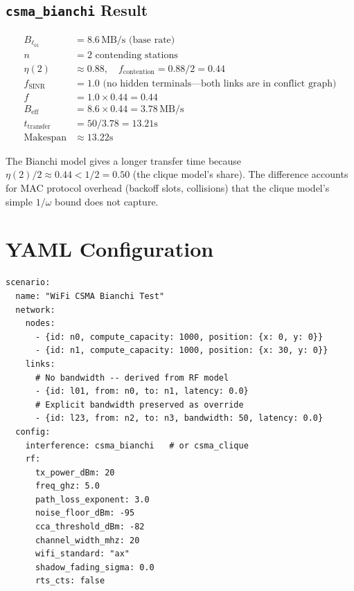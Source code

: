 \documentclass[11pt,letterpaper]{article}
\newcommand{\MBps}{\,\text{MB/s}}
\begin{document}
\subsection{\texttt{csma\_bianchi} Result}

\begin{align*}
B_{\ell_{01}} &= 8.6\MBps \text{ (base rate)} \\
n &= 2 \text{ contending stations} \\
\eta(2) &\approx 0.88, \quad f_\text{contention} = 0.88 / 2 = 0.44 \\
f_\text{SINR} &= 1.0 \text{ (no hidden terminals---both links are in conflict graph)} \\
f &= 1.0 \times 0.44 = 0.44 \\
B_\text{eff} &= 8.6 \times 0.44 = 3.78\MBps \\
t_\text{transfer} &= 50 / 3.78 = 13.21\text{s} \\
\text{Makespan} &\approx 13.22\text{s}
\end{align*}

The Bianchi model gives a longer transfer time because $\eta(2)/2 \approx
0.44 < 1/2 = 0.50$ (the clique model's share).  The difference accounts for
MAC protocol overhead (backoff slots, collisions) that the clique model's
simple $1/\omega$ bound does not capture.

\section{YAML Configuration}
\label{sec:yaml}

\begin{lstlisting}[language={},caption={WiFi scenario YAML example.}]
scenario:
  name: "WiFi CSMA Bianchi Test"
  network:
    nodes:
      - {id: n0, compute_capacity: 1000, position: {x: 0, y: 0}}
      - {id: n1, compute_capacity: 1000, position: {x: 30, y: 0}}
    links:
      # No bandwidth -- derived from RF model
      - {id: l01, from: n0, to: n1, latency: 0.0}
      # Explicit bandwidth preserved as override
      - {id: l23, from: n2, to: n3, bandwidth: 50, latency: 0.0}
  config:
    interference: csma_bianchi   # or csma_clique
    rf:
      tx_power_dBm: 20
      freq_ghz: 5.0
      path_loss_exponent: 3.0
      noise_floor_dBm: -95
      cca_threshold_dBm: -82
      channel_width_mhz: 20
      wifi_standard: "ax"
      shadow_fading_sigma: 0.0
      rts_cts: false
\end{lstlisting}
\end{document}
